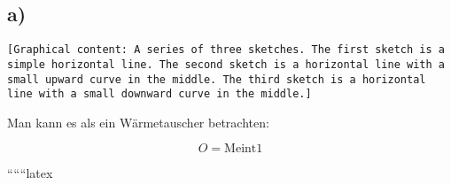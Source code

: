 

\subsection*{a)}

\begin{verbatim}
[Graphical content: A series of three sketches. The first sketch is a simple horizontal line. The second sketch is a horizontal line with a small upward curve in the middle. The third sketch is a horizontal line with a small downward curve in the middle.]
\end{verbatim}

Man kann es als ein Wärmetauscher betrachten:

\[ O = \text{Meint1} \]

``````latex